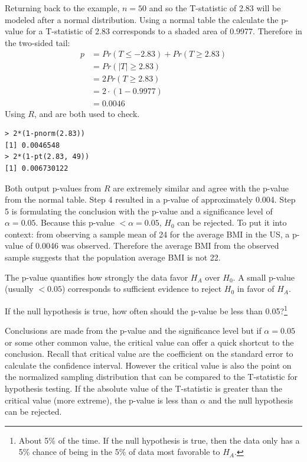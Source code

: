 Returning back to the example, $n=50$ and so the T-statistic of 2.83 will be modeled after a normal distribution. 
Using a normal table the calculate the p-value for a T-statistic of 2.83 corresponds to a shaded area of 0.9977. Therefore in the two-sided tail:
\begin{align*}
p &=Pr(T\leq -2.83) + Pr(T\geq 2.83)\\
&= Pr(|T| \geq 2.83)\\
&= 2Pr(T\geq 2.83)\\
&= 2 \cdot (1-0.9977)\\
&= 0.0046
\end{align*}
Using $R$,  and  are both used to check. \begin{verbatim}
> 2*(1-pnorm(2.83))
[1] 0.0046548
> 2*(1-pt(2.83, 49))
[1] 0.006730122
\end{verbatim}

Both output p-values from $R$ are extremely similar and agree with the p-value from the normal table. Step 4 resulted in a p-value of approximately 0.004. Step 5 is formulating the conclusion with the p-value and a significance level of $\alpha=0.05$. Because this p-value $< \alpha=0.05$, $H_0$ can be rejected. To put it into context: from observing a sample mean of 24 for the average BMI in the US, a p-value of 0.0046 was observed. Therefore the average BMI from the observed sample suggests that the population average BMI is not 22. 

\begin{termBox}{
The p-value quantifies how strongly the data favor $H_A$ over $H_0$. A small p-value (usually $<0.05$) corresponds to sufficient evidence to reject $H_0$ in favor of $H_A$.}
\end{termBox}

\begin{exercise}
If the null hypothesis is true, how often should the p-value be less than 0.05?\footnote{About 5\% of the time. If the null hypothesis is true, then the data only has a 5\% chance of being in the 5\% of data most favorable to $H_A$.}
\end{exercise}

\begin{tipBox}{
Conclusions are made from the p-value and the significance level but if $\alpha=0.05$ or some other common value, the critical value can offer a quick shortcut to the conclusion. Recall that critical value are the coefficient on the standard error to calculate the confidence interval. However the critical value is also the point on the normalized sampling distribution that can be compared to the T-statistic for hypothesis testing. If the absolute value of the T-statistic is greater than the critical value (more extreme), the p-value is less than $\alpha$ and the null hypothesis can be rejected.}
\end{tipBox}

